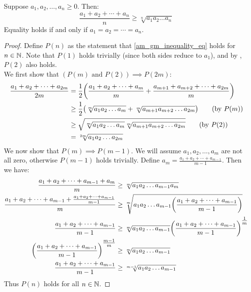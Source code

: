 \documentclass[main.tex]{subfiles}
\begin{document}
\begin{theorem}[AM-GM Inequality]
    Suppose $a_1,a_2,\ldots,a_n\ge 0$. Then:
    \begin{equation}\label{am_gm_inequality_eq}
        \frac{a_1+a_2+\cdots+a_n}{n} \ge \sqrt[n]{a_1a_2\ldots a_n}
    \end{equation}
    Equality holds if and only if $a_1=a_2=\cdots=a_n$.
\end{theorem}
\begin{proof}
    Define $P(n)$ as the statement that \eqref{am_gm_inequality_eq} holds for $n\in\N$. Note that $P(1)$ holds trivially (since both sides reduce to $a_1$), and by , $P(2)$ also holds.\\
    
    We first show that $(P(m) \text{ and } P(2))\implies P(2m)$:
    \begin{align*}
        \frac{a_1+a_2+\cdots+a_{2m}}{2m}
        &= \frac{1}{2}\qty(\frac{a_1+a_2+\cdots+a_m}{m} + \frac{a_{m+1}+a_{m+2}+\cdots+a_{2m}}{m}) \\
        &\ge \frac{1}{2}\qty(\sqrt[m]{a_1a_2\ldots a_m} + \sqrt[m]{a_{m+1}a_{m+2}\ldots a_{2m}})
            \tag{by $P(m)$} \\
        &\ge \sqrt{\sqrt[m]{a_1a_2\ldots a_m}\sqrt[m]{a_{m+1}a_{m+2}\ldots a_{2m}}}
            \tag{by $P(2)$} \\
        &= \sqrt[2m]{a_1a_2\ldots a_{2m}}
    \end{align*}
    We now show that $P(m)\implies P(m-1)$. We will assume $a_1,a_2,\ldots,a_m$ are not all zero, otherwise $P(m-1)$ holds trivially. Define $a_m=\frac{a_1+a_2+\cdots+a_{m-1}}{m-1}$. Then we have:
    \begin{align*}
        \frac{a_1+a_2+\cdots+a_{m-1}+a_m}{m}
        &\ge \sqrt[m]{a_1a_2\ldots a_{m-1}a_m} \\
        \frac{a_1+a_2+\cdots+a_{m-1}+\frac{a_1+a_2+\cdots+a_{m-1}}{m-1}}{m}
        &\ge \sqrt[m]{a_1a_2\ldots a_{m-1}\qty(\frac{a_1+a_2+\cdots+a_{m-1}}{m-1})} \\
        \frac{a_1+a_2+\cdots+a_{m-1}}{m-1}
        &\ge \sqrt[m]{a_1a_2\ldots a_{m-1}}\qty(\frac{a_1+a_2+\cdots+a_{m-1}}{m-1})^{\tfrac{1}{m}} \\
        \qty(\frac{a_1+a_2+\cdots+a_{m-1}}{m-1})^{\tfrac{m-1}{m}}
        &\ge \sqrt[m]{a_1a_2\ldots a_{m-1}} \\
        \frac{a_1+a_2+\cdots+a_{m-1}}{m-1}
        &\ge \sqrt[m-1]{a_1a_2\ldots a_{m-1}} \\
    \end{align*}
    Thus $P(n)$ holds for all $n\in\N$.
\end{proof}
\end{document}
